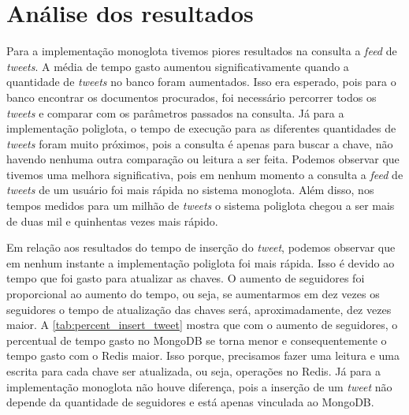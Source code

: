 


\section{Análise dos resultados}
\label{sec:resultEval}

Para a implementação monoglota tivemos piores resultados na consulta a \textit{feed} de \textit{tweets}. A média de tempo gasto aumentou significativamente quando a quantidade de \textit{tweets} no banco foram aumentados. Isso era esperado, pois para o banco encontrar os documentos procurados, foi necessário percorrer todos os \textit{tweets} e comparar com os parâmetros passados na consulta.
Já para a implementação poliglota, o tempo de execução para as diferentes quantidades de \textit{tweets} foram muito próximos, pois a consulta é apenas para buscar a chave, não havendo nenhuma outra comparação ou leitura a ser feita.
Podemos observar que tivemos uma melhora significativa, pois em nenhum momento a consulta a \textit{feed} de \textit{tweets} de um usuário foi mais rápida no sistema monoglota. Além disso, nos tempos medidos para um milhão de \textit{tweets} o sistema poliglota chegou a ser mais de duas mil e quinhentas vezes mais rápido.

Em relação aos resultados do tempo de inserção do \textit{tweet}, podemos observar que em nenhum instante a implementação poliglota foi mais rápida. Isso é devido ao tempo que foi gasto para atualizar as chaves. O aumento de seguidores foi proporcional ao aumento do tempo, ou seja, se aumentarmos em dez vezes os seguidores o tempo de atualização das chaves será, aproximadamente, dez vezes maior. A \autoref{tab:percent_insert_tweet} mostra que com o aumento de seguidores, o percentual de tempo gasto no MongoDB se torna menor e consequentemente o tempo gasto com o \ac{Redis} maior.
Isso porque, precisamos fazer uma leitura e uma escrita para cada chave ser atualizada, ou seja, operações no \ac{Redis}. Já para a implementação monoglota não houve diferença, pois a inserção de um \textit{tweet} não depende da quantidade de seguidores e está apenas vinculada ao MongoDB.


